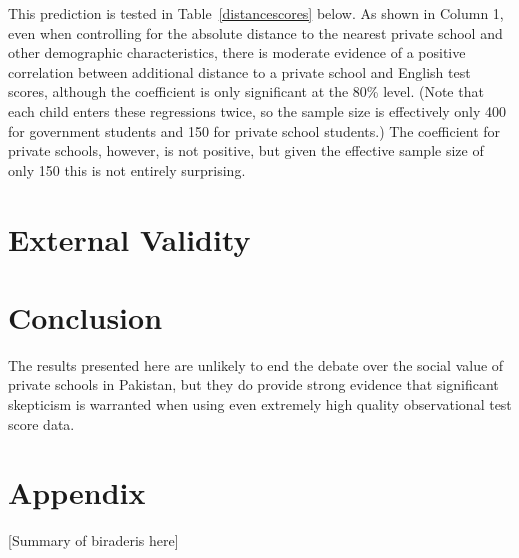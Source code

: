 \documentclass[12pt]{article}
\begin{document}
This prediction is tested in Table~\ref{distancescores} below. As shown in Column 1, even when controlling for the absolute distance to the nearest private school and other demographic characteristics, there is moderate evidence of a positive correlation between additional distance to a private school and English test scores, although the coefficient is only significant at the 80\% level. (Note that each child enters these regressions twice, so the sample size is effectively only 400 for government students and 150 for private school students.) The coefficient for private schools, however, is not positive, but given the effective sample size of only 150 this is not entirely surprising. 




\section{External Validity}\label{}


\section{Conclusion}\label{conclusion}
The results presented here are unlikely to end the debate over the social value of private schools in Pakistan, but they do provide strong evidence that significant skepticism is warranted when using even extremely high quality observational test score data.

\pagebreak

	
	

\pagebreak

\appendix


\section{Appendix}\label{biraderis}

[Summary of biraderis here]
\end{document}
